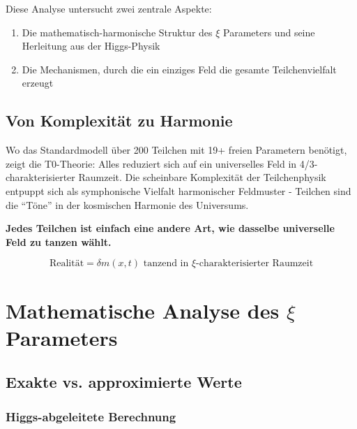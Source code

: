 \documentclass[12pt,a4paper]{article}
\newcommand{\xipar}{\ensuremath{\xi}}
\newcommand{\deltafield}{\ensuremath{\delta m}}
\begin{document}
	Diese Analyse untersucht zwei zentrale Aspekte:
	\begin{enumerate}
		\item Die mathematisch-harmonische Struktur des $\xi$ Parameters und seine Herleitung aus der Higgs-Physik
		\item Die Mechanismen, durch die ein einziges Feld die gesamte Teilchenvielfalt erzeugt
	\end{enumerate}
	
	\subsection{Von Komplexität zu Harmonie}
	\label{subsec:von-komplexitaet-zu-harmonie}
	
	Wo das Standardmodell über 200 Teilchen mit 19+ freien Parametern benötigt, zeigt die T0-Theorie: Alles reduziert sich auf ein universelles Feld in 4/3-charakterisierter Raumzeit. Die scheinbare Komplexität der Teilchenphysik entpuppt sich als symphonische Vielfalt harmonischer Feldmuster - Teilchen sind die ``Töne'' in der kosmischen Harmonie des Universums.
	
	\begin{tcolorbox}[colback=blue!5!white,colframe=blue!75!black,title=Zentrales T0-Prinzip]
		\textbf{Jedes Teilchen ist einfach eine andere Art, wie dasselbe universelle Feld zu tanzen wählt.}
		
		\begin{equation}
			\boxed{\text{Realität} = \deltafield(x,t) \text{ tanzend in } \xipar \text{-charakterisierter Raumzeit}}
			\label{eq:fundamentale_realitaet}
		\end{equation}
	\end{tcolorbox}
	
	\section{Mathematische Analyse des $\xi$ Parameters}
	\label{sec:xi_analyse}
	
	\subsection{Exakte vs. approximierte Werte}
	\label{subsec:exakt_vs_approximiert}
	
	\subsubsection{Higgs-abgeleitete Berechnung}
	\label{subsubsec:higgs_berechnung}
	
\end{document}
